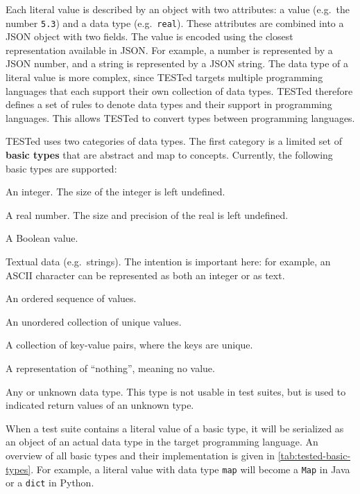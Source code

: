 \documentclass[../main]{subfiles}
\begin{document}
Each literal value is described by an object with two attributes: a value (e.g.\ the number \texttt{5.3}) and a data type (e.g.\ \texttt{real}).
These attributes are combined into a JSON object with two fields.
The value is encoded using the closest representation available in JSON\@.
For example, a number is represented by a JSON number, and a string is represented by a JSON string.
The data type of a literal value is more complex, since TESTed targets multiple programming languages that each support their own collection of data types.
TESTed therefore defines a set of rules to denote data types and their support in programming languages.
This allows TESTed to convert types between programming languages.

TESTed uses two categories of data types.
The first category is a limited set of \textbf{basic types} that are abstract and map to concepts.
Currently, the following basic types are supported:

\begin{description}[noitemsep]
    \item[\texttt{integer}] An integer. The size of the integer is left undefined.
    \item[\texttt{real}] A real number. The size and precision of the real is left undefined.
    \item[\texttt{boolean}] A Boolean value.
    \item[\texttt{text}] Textual data (e.g.\ strings).
          The intention is important here: for example, an ASCII character can be represented as both an integer or as text.
    \item[\texttt{sequence}] An ordered sequence of values.
    \item[\texttt{set}] An unordered collection of unique values.
    \item[\texttt{map}] A collection of key-value pairs, where the keys are unique.
    \item[\texttt{nothing}] A representation of ``nothing'', meaning no value. 
    \item[\texttt{any}] Any or unknown data type.
         This type is not usable in test suites, but is used to indicated return values of an unknown type.
\end{description}

When a test suite contains a literal value of a basic type, it will be serialized as an object of an actual data type in the target programming language.
An overview of all basic types and their implementation is given in \vref{tab:tested-basic-types}.
For example, a literal value with data type \texttt{map} will become a \texttt{Map} in Java or a \texttt{dict} in Python.
\end{document}
